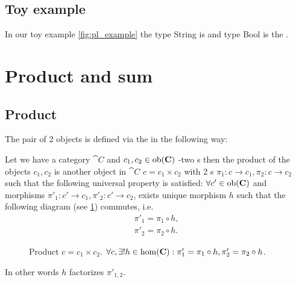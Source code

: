 \subsection{Toy example}

\begin{example}
In our toy example \cref{fig:pl_example} the type String is
 and type Bool is the
.
\end{example}

\section{Product and sum}
\label{sec:product_and_sum}
\subsection{Product}
The pair of 2 objects is defined via the  in
the following way:
\begin{definition}[Product]
\label{def:product}
Let we have a category $\cat{C}$ and $c_1, c_2 \in \mathrm{ob}(\mathbf{C})$ -two
s then the product of the objects $c_1, c_2$ is
another object in $\cat{C}$ $c = c_1 \times c_2$ with 2
s $\pi_1: c \to c_1, \pi_2: c \to c_2$ such
that the following universal property is satisfied: $\forall c' \in \mathrm{ob}(\mathbf{C})$
and morphisms $\pi'_1: c' \to c_1, \pi'_2: c' \to c_2$, exists unique
morphism $h$ such that the following diagram (see \cref{fig:product})
commutes, i.e. 
\begin{eqnarray}
\pi'_1 = \pi_1 \circ h, 
\nonumber \\
\pi'_2 = \pi_2 \circ h.
\label{eq:product}
\end{eqnarray}
\begin{figure}[H]
  \centering
  \caption{Product $c = c_1 \times c_2$. $\forall c, \exists! h \in
    \mathrm{hom}(\mathbf{C}): \pi'_1 = \pi_1 \circ h, \pi'_2 = \pi_2 \circ h$.}
  \label{fig:product}
\end{figure}
In other words $h$ factorizes $\pi'_{1,2}$.
\end{definition}

